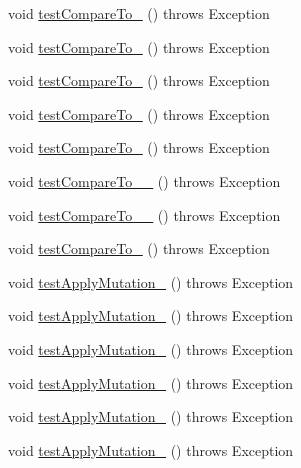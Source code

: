 \begin{DoxyCompactItemize}
\item 
void \hyperlink{classorg_1_1jgap_1_1impl_1_1_boolean_gene_test_a4d220c8462d4e811ac9a23c9024773e4}{test\-Compare\-To\-\_} ()  throws Exception 
\item 
void \hyperlink{classorg_1_1jgap_1_1impl_1_1_boolean_gene_test_a6adec80491c8d95c20ed3ded865dddb6}{test\-Compare\-To\-\_} ()  throws Exception 
\item 
void \hyperlink{classorg_1_1jgap_1_1impl_1_1_boolean_gene_test_a1bb50d4dd40c979902b7d9ccd865dfe2}{test\-Compare\-To\-\_} ()  throws Exception 
\item 
void \hyperlink{classorg_1_1jgap_1_1impl_1_1_boolean_gene_test_a1bf39a9ef4d6fd598d67aced8cb4bfc0}{test\-Compare\-To\-\_} ()  throws Exception 
\item 
void \hyperlink{classorg_1_1jgap_1_1impl_1_1_boolean_gene_test_a468a3046d931633a524482a39acb9f53}{test\-Compare\-To\-\_} ()  throws Exception 
\item 
void \hyperlink{classorg_1_1jgap_1_1impl_1_1_boolean_gene_test_a3dd780686c5882131b59a0b9bcaf8ff4}{test\-Compare\-To\-\_\-\_} ()  throws Exception 
\item 
void \hyperlink{classorg_1_1jgap_1_1impl_1_1_boolean_gene_test_acd374e60b7dfabe280cdd6ec6b8dc591}{test\-Compare\-To\-\_\-\_} ()  throws Exception 
\item 
void \hyperlink{classorg_1_1jgap_1_1impl_1_1_boolean_gene_test_a0514dcf9e17cee0dffb9b93e815db71b}{test\-Compare\-To\-\_} ()  throws Exception 
\item 
void \hyperlink{classorg_1_1jgap_1_1impl_1_1_boolean_gene_test_a5d15629734e0d3ea53e1b1aaae723454}{test\-Apply\-Mutation\-\_} ()  throws Exception 
\item 
void \hyperlink{classorg_1_1jgap_1_1impl_1_1_boolean_gene_test_aceac01532c3254bb2537591a28127c58}{test\-Apply\-Mutation\-\_} ()  throws Exception 
\item 
void \hyperlink{classorg_1_1jgap_1_1impl_1_1_boolean_gene_test_a39c14919d3647fc335522c1dc19e6dd3}{test\-Apply\-Mutation\-\_} ()  throws Exception 
\item 
void \hyperlink{classorg_1_1jgap_1_1impl_1_1_boolean_gene_test_ae894d6f2e3e540c0049d68c1bf5cabc7}{test\-Apply\-Mutation\-\_} ()  throws Exception 
\item 
void \hyperlink{classorg_1_1jgap_1_1impl_1_1_boolean_gene_test_a8f1c8b12e8dbbf3c2c212beac5cbd61b}{test\-Apply\-Mutation\-\_} ()  throws Exception 
\item 
void \hyperlink{classorg_1_1jgap_1_1impl_1_1_boolean_gene_test_ae067e5eaf68fb5e0345cc890ad089987}{test\-Apply\-Mutation\-\_} ()  throws Exception 

\end{DoxyCompactItemize}
